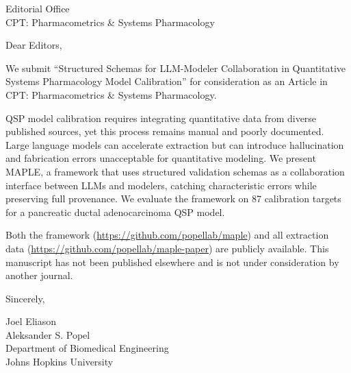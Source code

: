 \documentclass[11pt]{article}
\begin{document}
\noindent
Editorial Office \\
CPT: Pharmacometrics \& Systems Pharmacology

\bigskip

\noindent Dear Editors,

We submit ``Structured Schemas for LLM-Modeler Collaboration in Quantitative Systems Pharmacology Model Calibration'' for consideration as an Article in CPT: Pharmacometrics \& Systems Pharmacology.

QSP model calibration requires integrating quantitative data from diverse published sources, yet this process remains manual and poorly documented. Large language models can accelerate extraction but can introduce hallucination and fabrication errors unacceptable for quantitative modeling. We present MAPLE, a framework that uses structured validation schemas as a collaboration interface between LLMs and modelers, catching characteristic errors while preserving full provenance. We evaluate the framework on 87 calibration targets for a pancreatic ductal adenocarcinoma QSP model.

Both the framework (\url{https://github.com/popellab/maple}) and all extraction data (\url{https://github.com/popellab/maple-paper}) are publicly available. This manuscript has not been published elsewhere and is not under consideration by another journal.

\bigskip

\noindent
Sincerely,

\medskip

\noindent
Joel Eliason \\
Aleksander S. Popel \\
Department of Biomedical Engineering \\
Johns Hopkins University
\end{document}
